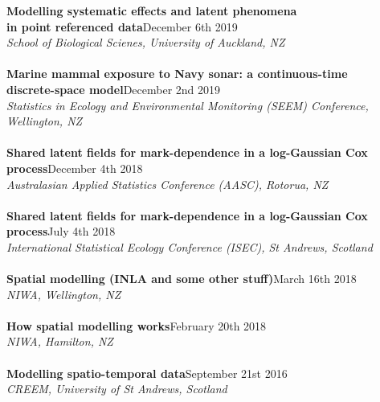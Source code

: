 \documentclass[10pt,letter]{article}
\begin{document}
                           \newpage
                           \noindent
{\textbf{Modelling systematic effects and latent phenomena \\
                                         in point referenced data}}\hfill December 6th 2019\\
                                     {\sl School of Biological Scienes, University of Auckland, NZ}\\
                                     \hdashrule[0.5ex]{4cm}{1pt}{1pt}\\
                                               {\textbf{Marine mammal exposure to Navy sonar: a continuous-time \\
                                                   discrete-space model}}\hfill December 2nd 2019\\
                                               {\sl Statistics in Ecology and Environmental Monitoring (SEEM) Conference, Wellington, NZ}\\
                                               \hdashrule[0.5ex]{4cm}{1pt}{1pt}\\
                                                         {\textbf{Shared latent fields for mark-dependence in a log-Gaussian Cox process}}\hfill December 4th 2018\\
                                                         {\sl Australasian Applied Statistics Conference (AASC), Rotorua, NZ}\\
 \hdashrule[0.5ex]{4cm}{1pt}{1pt}\\
{\textbf{Shared latent fields for mark-dependence in a log-Gaussian Cox process}}\hfill July 4th 2018\\
 {\sl International Statistical Ecology Conference (ISEC), St Andrews, Scotland}\\
 \hdashrule[0.5ex]{4cm}{1pt}{1pt}\\
{\textbf{Spatial modelling (INLA and some other stuff)}}\hfill March 16th 2018\\
 {\sl NIWA, Wellington, NZ}\\
 \hdashrule[0.5ex]{4cm}{1pt}{1pt}\\
 \noindent
{\textbf{How spatial modelling works}}\hfill February 20th 2018\\
 {\sl NIWA, Hamilton, NZ}\\
\hdashrule[0.5ex]{4cm}{1pt}{1pt}\\
{\textbf{Modelling spatio-temporal data}}\hfill September 21st 2016\\
 {\sl CREEM, University of St Andrews, Scotland}\\
\end{document}
